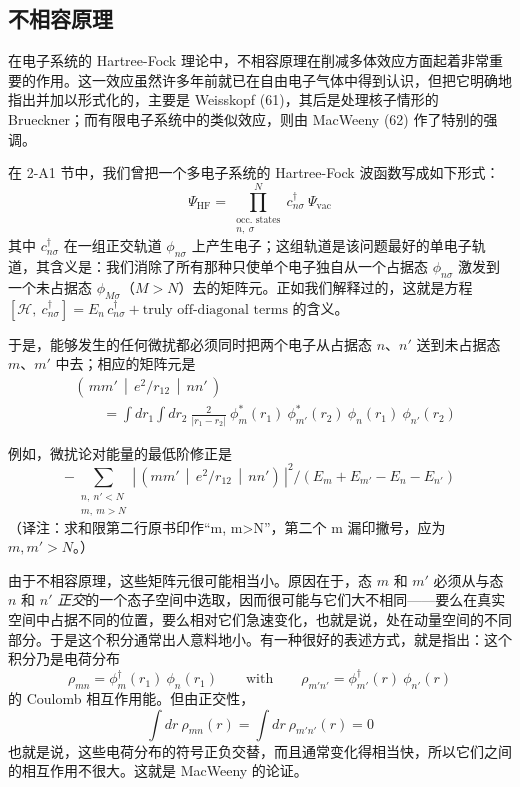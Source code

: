 \subsection{不相容原理}

在电子系统的 Hartree-Fock 理论中，不相容原理在削减多体效应方面起着非常重要的作用。这一效应虽然许多年前就已在自由电子气体中得到认识，但把它明确地指出并加以形式化的，主要是 Weisskopf (61)，其后是处理核子情形的 Brueckner；而有限电子系统中的类似效应，则由 MacWeeny (62) 作了特别的强调。

在 2-A1 节中，我们曾把一个多电子系统的 Hartree-Fock 波函数写成如下形式：
\begin{equation*}
\Psi_{\mathrm{HF}}=\prod_{\substack{\text{occ. states}\\ n,\ \sigma}}^{N}c^{\dagger}_{n\sigma}\ \Psi_{\mathrm{vac}}
\end{equation*}
其中 $c^{\dagger}_{n\sigma}$ 在一组正交轨道 $\phi_{n\sigma}$ 上产生电子；这组轨道是该问题最好的单电子轨道，其含义是：我们消除了所有那种只使单个电子独自从一个占据态 $\phi_{n\sigma}$ 激发到一个未占据态 $\phi_{M\sigma}$（$M>N$）去的矩阵元。正如我们解释过的，这就是方程
$[\mathcal{H},\ c^{\dagger}_{n\sigma}]=E_{n}\,c^{\dagger}_{n\sigma}+\text{truly off-diagonal terms}$
的含义。

于是，能够发生的任何微扰都必须同时把两个电子从占据态 $n$、$n'$ 送到未占据态 $m$、$m'$ 中去；相应的矩阵元是
\begin{align*}
&\left(\,mm'\,\middle|\,e^{2}/r_{12}\,\middle|\,nn'\,\right)\\
&\qquad=\int dr_{1}\int dr_{2}\ \frac{2}{|r_{1}-r_{2}|}\ \phi^{*}_{m}(r_{1})\ \phi^{*}_{m'}(r_{2})\ \phi_{n}(r_{1})\ \phi_{n'}(r_{2})
\end{align*}

例如，微扰论对能量的最低阶修正是
\begin{equation*}
-\sum_{\substack{n,\ n'<N\\ m,\ m>N}}\left|\,\left(mm'\,\middle|\,e^{2}/r_{12}\,\middle|\,nn'\right)\,\right|^{2}\Big/\left(E_{m}+E_{m'}-E_{n}-E_{n'}\right)
\end{equation*}
（译注：求和限第二行原书印作“m, m>N”，第二个 m 漏印撇号，应为 $m, m'>N$。）

由于不相容原理，这些矩阵元很可能相当小。原因在于，态 $m$ 和 $m'$ 必须从与态 $n$ 和 $n'$ \emph{正交}的一个态子空间中选取，因而很可能与它们大不相同——要么在真实空间中占据不同的位置，要么相对它们急速变化，也就是说，处在动量空间的不同部分。于是这个积分通常出人意料地小。有一种很好的表述方式，就是指出：这个积分乃是电荷分布
\begin{equation*}
\rho_{mn}=\phi^{\dagger}_{m}(r_{1})\ \phi_{n}(r_{1})\qquad\text{with}\qquad\rho_{m'n'}=\phi^{\dagger}_{m'}(r)\ \phi_{n'}(r)
\end{equation*}
的 Coulomb 相互作用能。但由正交性，
\begin{equation*}
\int dr\ \rho_{mn}(r)=\int dr\ \rho_{m'n'}(r)=0
\end{equation*}
也就是说，这些电荷分布的符号正负交替，而且通常变化得相当快，所以它们之间的相互作用不很大。这就是 MacWeeny 的论证。

